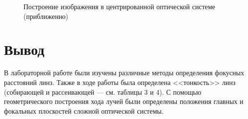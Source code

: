 \documentclass[a4paper]{article}
\begin{document}
\begin{figure}[!ht]

\caption{Построение изображения в центрированной
оптической системе (приближенно)}

\end{figure}

\section{Вывод}

    В лабораторной работе были изучены различные методы определения фокусных расстояний линз. Также в ходе работы была определена <<тонкость>> линз (собирающей и рассеивающей --- см. таблицы 3 и 4). С помощью геометрического построения хода лучей были определены положения главных и фокальных плоскостей сложной оптической системы.
\end{document}
